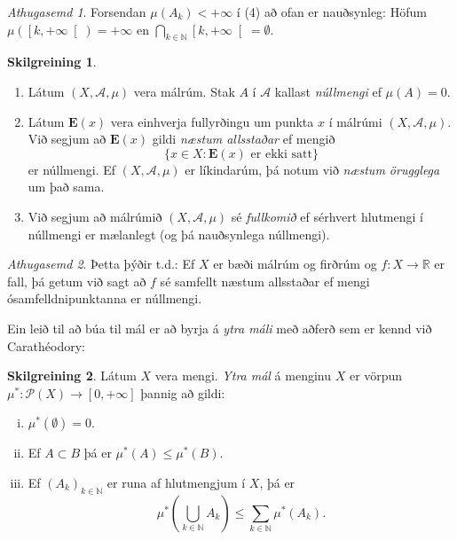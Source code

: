 \documentclass[a4paper,icelandic,11pt]{book}
\theoremstyle{plain}      \newtheorem{setn}{Setning}[chapter]
\theoremstyle{definition} \newtheorem{skilgr}[setn]{Skilgreining}
\theoremstyle{remark}     \newtheorem*{ath}{Athugasemd}
\newcommand{\R}{\mathbb R}
\newcommand{\N}{\mathbb N}
\begin{document}
\begin{ath}
  Forsendan $\mu(A_{k})<+\infty$ í (4) að ofan er nauðsynleg: Höfum
  $\mu(\left[k,+\infty\right[)=+\infty$ en
  $\bigcap_{k\in\N}\left[k,+\infty\right[=\emptyset$.
\end{ath}
\begin{skilgr}
  \begin{enumerate}[(1)]
  \item Látum $(X,\mathcal A,\mu)$ vera málrúm. Stak $A$ í
    $\mathcal{A}$ kallast \emph{núllmengi}
    ef $\mu(A)=0$.
  \item Látum $\mathbf{E}(x)$ vera einhverja fullyrðingu um punkta $x$
    í málrúmi $(X,\mathcal A,\mu)$. Við segjum að $\mathbf{E}(x)$
    gildi \emph{næstum
      allsstaðar} ef mengið
    \[
    \{x\in X : \mathbf{E}(x)\text{ er ekki satt}\}
    \]
    er núllmengi. Ef $(X,\mathcal A,\mu)$ er líkindarúm, þá notum við
    \emph{næstum örugglega}
    um það sama.
  \item Við segjum að málrúmið $(X,\mathcal A,\mu)$ sé
    \emph{fullkomið}
    ef sérhvert hlutmengi í núllmengi er mælanlegt (og þá nauðsynlega
    núllmengi).
  \end{enumerate}
\end{skilgr}
\begin{ath}
  Þetta þýðir t.d.: Ef $X$ er bæði málrúm og firðrúm og $f:X\to\R$ er
  fall, þá getum við sagt að $f$ sé samfellt næstum allsstaðar ef
  mengi ósamfelldnipunktanna er núllmengi.
\end{ath}
Ein leið til að búa til mál er að byrja á \emph{ytra máli} með aðferð
sem er kennd við
Carathéodory:
\begin{skilgr}
  Látum $X$ vera mengi. \emph{Ytra mál} á menginu $X$ er vörpun
  $\mu^{*}:\mathcal{P}(X)\to\left[0,+\infty\right]$ þannig að gildi:
  \begin{enumerate}[(i)]
  \item $\mu^{*}(\emptyset)=0$.
  \item Ef $A\subset B$ þá er $\mu^{*}(A)\le\mu^{*}(B)$.
  \item Ef $(A_{k})_{k\in\N}$ er runa af hlutmengjum í $X$, þá er
    \[
    \mu^{*}(\bigcup_{k\in\N}A_{k})
    \le \sum_{k\in\N}\mu^{*}(A_{k}).
    \]
  \end{enumerate}
\end{skilgr}
\end{document}
